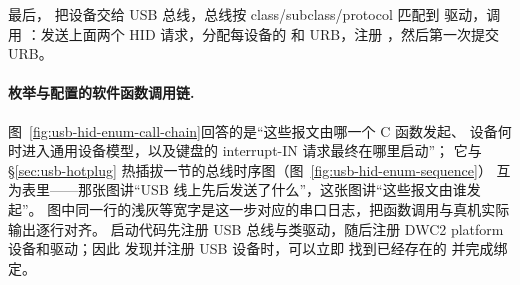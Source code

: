 最后， 把设备交给 USB 总线，总线按 class/subclass/protocol 匹配到  驱动，调用 ：发送上面两个 HID 请求，分配每设备的  和 URB，注册 ，然后第一次提交 URB。

\paragraph{枚举与配置的软件函数调用链.}
图~\ref{fig:usb-hid-enum-call-chain}回答的是“这些报文由哪一个 C 函数发起、
设备何时进入通用设备模型，以及键盘的 interrupt-IN 请求最终在哪里启动”；
它与 §\ref{sec:usb-hotplug} 热插拔一节的总线时序图（图~\ref{fig:usb-hid-enum-sequence}）
互为表里——那张图讲“USB 线上先后发送了什么”，这张图讲“这些报文由谁发起”。
图中同一行的浅灰等宽字是这一步对应的串口日志，把函数调用与真机实际输出逐行对齐。
启动代码先注册 USB 总线与类驱动，随后注册 DWC2 platform 设备和驱动；因此
发现并注册 USB 设备时，可以立即
找到已经存在的  并完成绑定。


